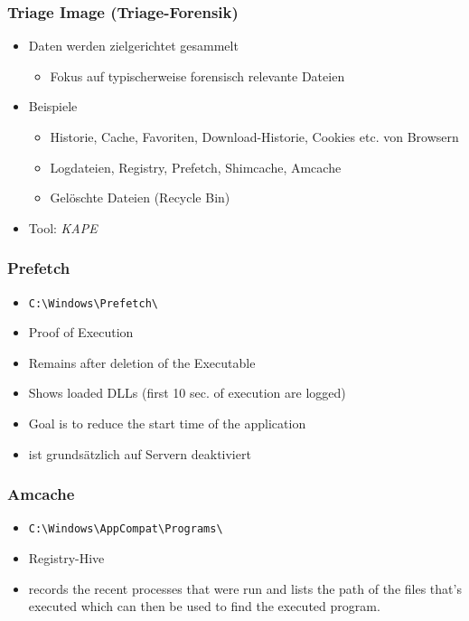 \subsubsection{Triage Image (Triage-Forensik)}
\begin{itemize}
    \item Daten werden zielgerichtet gesammelt
    \begin{itemize}
        \item Fokus auf typischerweise forensisch relevante Dateien
    \end{itemize}
    \item Beispiele
    \begin{itemize}
        \item Historie, Cache, Favoriten, Download-Historie, Cookies etc. von Browsern
        \item Logdateien, Registry, Prefetch, Shimcache, Amcache
        \item Gelöschte Dateien (Recycle Bin)
    \end{itemize}
    \item Tool: \textit{KAPE}
\end{itemize}

\subsubsection{Prefetch}
\begin{itemize}
    \item \lstinline|C:\Windows\Prefetch\|
    \item Proof of Execution
    \item Remains after deletion of the Executable
    \item Shows loaded DLLs (first 10 sec. of execution are logged)
    \item Goal is to reduce the start time of the application
    \item ist grundsätzlich auf Servern deaktiviert
\end{itemize}

\subsubsection{Amcache}
\begin{itemize}
    \item \lstinline|C:\Windows\AppCompat\Programs\|
    \item Registry-Hive
    \item records the recent processes that were run and lists the path of the files that's executed which can then be used to find the executed program.
\end{itemize}

